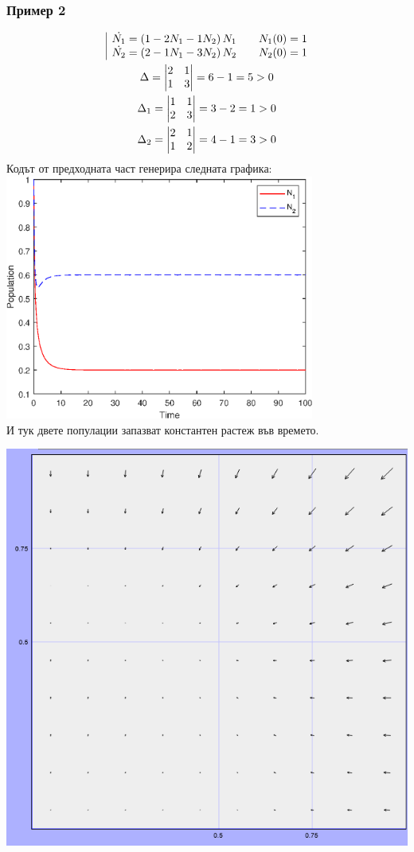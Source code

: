 \documentclass[a4paper,fleqn,12pt]{article}
\begin{document}
\subsubsection*{Пример 2}
\begin{gather*}
	\begin{array}{|l@{}}
	\dot{N_1} = \left(1 - 2N_1 - 1 N_2 \right) N_1 \qquad N_1(0) = 1\\
	\dot{N_2} = \left(2 - 1N_1 - 3 N_2 \right) N_2  \qquad N_2(0) = 1
	\end{array} \\
	\Delta = \begin{vmatrix} 2 & 1 \\ 1 & 3 \end{vmatrix} = 6 - 1 = 5 > 0 \\
	\Delta_1 = \begin{vmatrix}1 & 1 \\ 2 & 3 \end{vmatrix} = 3 - 2 = 1 > 0 \\
	\Delta_2 = \begin{vmatrix}2 & 1\\ 1 & 2 \end{vmatrix} = 4-1 = 3 > 0
\end{gather*}
Кодът от предходната част генерира следната графика: \\
\includegraphics [width=4in]{ecologyComp_02.eps}\\
И тук двете популации запазват константен растеж във времето.
\begin{center}
\includegraphics [width=6in]{fazof-portret-primer-2.png}
\end{center}
\end{document}
